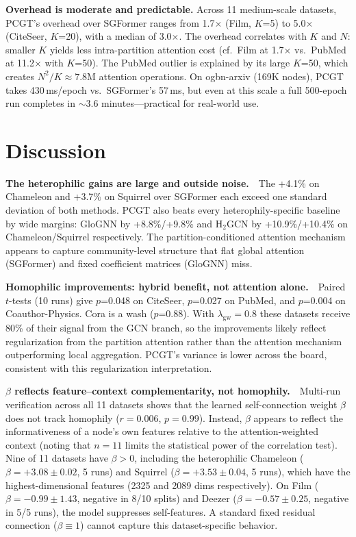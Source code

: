 \documentclass[sigconf]{acmart}
\begin{document}
\noindent \textbf{Overhead is moderate and predictable.} Across 11 medium-scale datasets, PCGT's overhead over SGFormer ranges from 1.7$\times$ (Film, $K$=5) to 5.0$\times$ (CiteSeer, $K$=20), with a median of 3.0$\times$. The overhead correlates with $K$ and $N$: smaller $K$ yields less intra-partition attention cost (cf.\ Film at 1.7$\times$ vs.\ PubMed at 11.2$\times$ with $K$=50). The PubMed outlier is explained by its large $K$=50, which creates $N^2/K \approx 7.8$M attention operations. On ogbn-arxiv (169K nodes), PCGT takes 430\,ms/epoch vs.\ SGFormer's 57\,ms, but even at this scale a full 500-epoch run completes in $\sim$3.6 minutes---practical for real-world use.

\section{Discussion}

\textbf{The heterophilic gains are large and outside noise.}~~The +4.1\% on Chameleon and +3.7\% on Squirrel over SGFormer each exceed one standard deviation of both methods. PCGT also beats every heterophily-specific baseline by wide margins: GloGNN by +8.8\%/+9.8\% and H$_2$GCN by +10.9\%/+10.4\% on Chameleon/Squirrel respectively. The partition-conditioned attention mechanism appears to capture community-level structure that flat global attention (SGFormer) and fixed coefficient matrices (GloGNN) miss.

\textbf{Homophilic improvements: hybrid benefit, not attention alone.}~~Paired $t$-tests (10 runs) give $p$=0.048 on CiteSeer, $p$=0.027 on PubMed, and $p$=0.004 on Coauthor-Physics. Cora is a wash ($p$=0.88). With $\lambda_{\text{gw}}=0.8$ these datasets receive 80\% of their signal from the GCN branch, so the improvements likely reflect regularization from the partition attention rather than the attention mechanism outperforming local aggregation. PCGT's variance is lower across the board, consistent with this regularization interpretation.

\textbf{$\beta$ reflects feature--context complementarity, not homophily.}~~Multi-run verification across all 11 datasets shows that the learned self-connection weight $\beta$ does not track homophily ($r = 0.006$, $p = 0.99$). Instead, $\beta$ appears to reflect the informativeness of a node's own features relative to the attention-weighted context (noting that $n=11$ limits the statistical power of the correlation test). Nine of 11 datasets have $\beta > 0$, including the heterophilic Chameleon ($\beta = +3.08 \pm 0.02$, 5 runs) and Squirrel ($\beta = +3.53 \pm 0.04$, 5 runs), which have the highest-dimensional features (2325 and 2089 dims respectively). On Film ($\beta = -0.99 \pm 1.43$, negative in 8/10 splits) and Deezer ($\beta = -0.57 \pm 0.25$, negative in 5/5 runs), the model suppresses self-features. A standard fixed residual connection ($\beta \equiv 1$) cannot capture this dataset-specific behavior.
\end{document}
